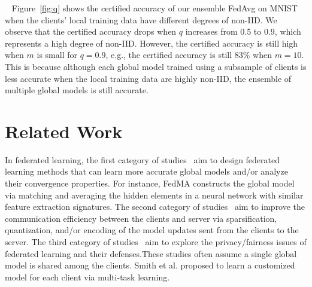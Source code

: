\documentclass[letterpaper]{article} %
\newcommand{\myparatight}[1]{\smallskip\noindent{\bf {#1}:}~}
\begin{document}
\myparatight{Impact of degree of non-IID $q$} Figure~\ref{fig:q} shows the certified accuracy of our ensemble FedAvg on MNIST when the clients' local training data have different degrees of non-IID. We observe that the certified accuracy drops when $q$ increases from 0.5 to 0.9, which represents a high degree of non-IID. However, the certified accuracy is still high when $m$ is small for $q=0.9$, e.g., the certified accuracy is still 83\% when $m=10$.  This is because  although each global model trained using a subsample of clients is less accurate when the local training data are highly non-IID, the ensemble of multiple global models is still accurate.


\section{Related Work}
In federated learning, the first category of studies~\cite{smith2017federated,li2019convergence,wang2020federated,liu2020federated,peng2019federated} aim to design  federated learning methods that can learn more accurate global models and/or analyze their convergence properties. For instance, FedMA \cite{wang2020federated} constructs the global model via matching and averaging the hidden elements in a neural network with similar feature extraction signatures. The second category of studies~\cite{konevcny2016federated,mcmahan2016communication,wen2017terngrad,alistarh2017qsgd,lee2017speeding,sahu2018convergence,bernstein2018signsgd,vogels2019powersgd,yurochkin2019bayesian,mohri2019agnostic,wang2020federated,li2020practical,li2020acceleration,hamer2020fedboost,rothchildfetchsgd,malinovsky2020local} aim to improve the communication efficiency between the clients and server via sparsification, quantization, and/or encoding of the model updates sent from the clients to the server. The third category of studies~\cite{bonawitz2017practical,geyer2017differentially,hitaj2017deep,melis2019exploiting,zhu2019deep,mohri2019agnostic,wang2020federatedlatent,Li2020Fair} aim to explore the privacy/fairness issues of federated learning and their defenses.These studies often assume a single global model is shared among the clients.  Smith et al. \cite{smith2017federated} proposed to learn a customized model for each client via multi-task learning.
\end{document}
